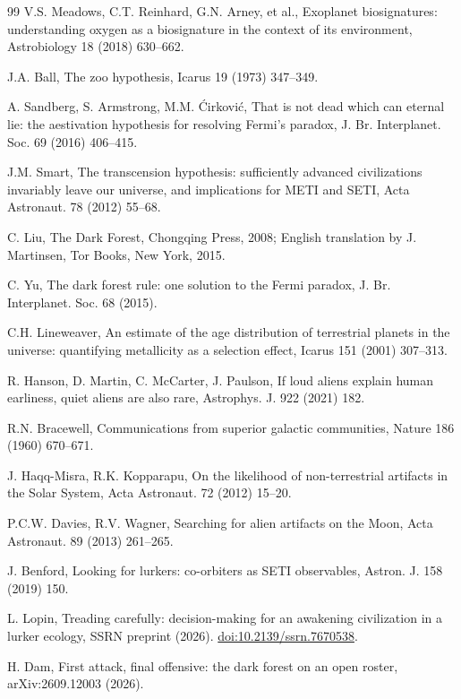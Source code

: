 \documentclass[preprint,12pt]{elsarticle}
\theoremstyle{definition}
\begin{document}
\begin{thebibliography}{99}
 V.S. Meadows, C.T. Reinhard, G.N. Arney, et al., Exoplanet biosignatures: understanding oxygen as a biosignature in the context of its environment, Astrobiology 18 (2018) 630--662.

 J.A. Ball, The zoo hypothesis, Icarus 19 (1973) 347--349.

 A. Sandberg, S. Armstrong, M.M. \'Cirkovi\'c, That is not dead which can eternal lie: the aestivation hypothesis for resolving Fermi's paradox, J. Br. Interplanet. Soc. 69 (2016) 406--415.

 J.M. Smart, The transcension hypothesis: sufficiently advanced civilizations invariably leave our universe, and implications for METI and SETI, Acta Astronaut. 78 (2012) 55--68.

 C. Liu, The Dark Forest, Chongqing Press, 2008; English translation by J. Martinsen, Tor Books, New York, 2015.

 C. Yu, The dark forest rule: one solution to the Fermi paradox, J. Br. Interplanet. Soc. 68 (2015).

 C.H. Lineweaver, An estimate of the age distribution of terrestrial planets in the universe: quantifying metallicity as a selection effect, Icarus 151 (2001) 307--313.

 R. Hanson, D. Martin, C. McCarter, J. Paulson, If loud aliens explain human earliness, quiet aliens are also rare, Astrophys. J. 922 (2021) 182.

 R.N. Bracewell, Communications from superior galactic communities, Nature 186 (1960) 670--671.

 J. Haqq-Misra, R.K. Kopparapu, On the likelihood of non-terrestrial artifacts in the Solar System, Acta Astronaut. 72 (2012) 15--20.

 P.C.W. Davies, R.V. Wagner, Searching for alien artifacts on the Moon, Acta Astronaut. 89 (2013) 261--265.

 J. Benford, Looking for lurkers: co-orbiters as SETI observables, Astron. J. 158 (2019) 150.

 L. Lopin, Treading carefully: decision-making for an awakening civilization in a lurker ecology, SSRN preprint (2026). \href{https://doi.org/10.2139/ssrn.7670538}{doi:10.2139/ssrn.7670538}.

 H. Dam, First attack, final offensive: the dark forest on an open roster, arXiv:2609.12003 (2026).


\end{thebibliography}
\end{document}

